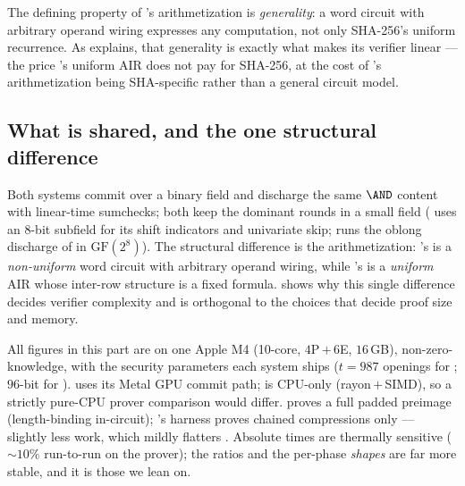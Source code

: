The defining property of \binius{}'s arithmetization is \emph{generality}:
a word circuit with arbitrary operand wiring expresses any computation,
not only SHA-256's uniform recurrence. As  explains, that
generality is exactly what makes its verifier linear --- the price
\zinc{}'s uniform AIR does not pay for SHA-256, at the cost of \zinc{}'s
arithmetization being SHA-specific rather than a general circuit model.

\subsection{What is shared, and the one structural difference}

Both systems commit over a binary field and discharge the same $\AND$
content with linear-time sumchecks; both keep the dominant rounds in a
small field (\binius{} uses an $8$-bit subfield for its shift indicators
and univariate skip; \zinc{} runs the oblong discharge of
 in $\mathrm{GF}(2^8)$). The structural difference is
the arithmetization: \binius{}'s is a \emph{non-uniform} word circuit with
arbitrary operand wiring, while \zinc{}'s is a \emph{uniform} AIR whose
inter-row structure is a fixed formula.  shows why this
single difference decides verifier complexity and is orthogonal to the
choices that decide proof size and memory.

\begin{remark}
\label{rem:cmp-setup}
All figures in this part are on one Apple M4 (10-core, $4$P\,$+$\,$6$E,
$16$\,GB), non-zero-knowledge, with the security parameters each system
ships ($t=987$ openings for \zinc{}; $96$-bit for \binius{}). \zinc{} uses
its Metal GPU commit path; \binius{} is CPU-only (rayon\,$+$\,SIMD), so a
strictly pure-CPU prover comparison would differ. \binius{} proves a full
padded preimage (length-binding in-circuit); \zinc{}'s harness proves
chained compressions only --- slightly less work, which mildly flatters
\zinc{}. Absolute times are thermally sensitive ($\sim$$10\%$ run-to-run
on the prover); the ratios and the per-phase \emph{shapes} are far more
stable, and it is those we lean on.
\end{remark}

